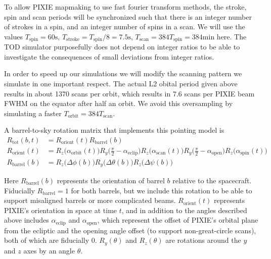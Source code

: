 \documentclass{article}
\begin{document}
To allow PIXIE mapmaking to use fast fourier transform methods, the stroke, spin
and scan periods will be synchronized such that there is an integer number of
strokes in a spin, and an integer number of spins in a scan. We will use the
values $T_\textrm{spin} = 60 \textrm{s}$, $T_\textrm{stroke} = T_\textrm{spin}/8 =
7.5 \textrm{s}$, $T_\textrm{scan} = 384 T_\textrm{spin} = 384 \textrm{min}$ here.
The TOD simulator purposefully does not depend on integer ratios to be able
to investigate the consequences of small deviations from integer ratios.

In order to speed up our simulations we will modify the scanning pattern we
simulate in one important respect. The actual L2 obital
period given above results in about 1370 scans per orbit, which results in
7.6 scans per PIXIE beam FWHM on the equator after half an orbit. We avoid
this oversampling by simulating a faster $T_\textrm{orbit} = 384 T_\textrm{scan}$.

A barrel-to-sky rotation matrix that implements this pointing model is
\begin{align}
	R_\textrm{tot}(b,t)  &= R_\textrm{orient}(t)R_\textrm{barrel}(b) \\
	R_\textrm{orient}(t) &= R_z\big(\alpha_\textrm{orbit}(t)\big)
		R_y\Big(\frac\pi2-\alpha_\textrm{eclip}\Big)
		R_z\big(\alpha_\textrm{scan}(t)\big)R_y\Big(\frac\pi2-\alpha_\textrm{open}\Big)
		R_z\big(\alpha_\textrm{spin}(t)\big) \\
	R_\textrm{barrel}(b) &= R_z\big(\Delta\phi(b)\big)R_y\big(\Delta\theta(b)\big)R_z\big(\Delta\psi(b)\big) \label{eq:barrel}
\end{align}

Here $R_\textrm{barrel}(b)$ represents the orientation of barrel $b$ relative
to the spacecraft. Fiducially $R_\textrm{barrel} = 1$ for both barrels, but
we include this rotation to be able to support misaligned barrels or more
complicated beams. $R_\textrm{orient}(t)$ represents PIXIE's orientation
in space at time $t$, and in addition to the angles described above includes
$\alpha_\textrm{eclip}$ and $\alpha_\textrm{open}$, which represent the
offset of PIXIE's orbital plane from the ecliptic and the opening angle
offset (to support non-great-circle scans), both of which are fiducially 0.
$R_y(\theta)$ and $R_z(\theta)$ are rotations around the $y$ and $z$ axes
by an angle $\theta$.
\end{document}
